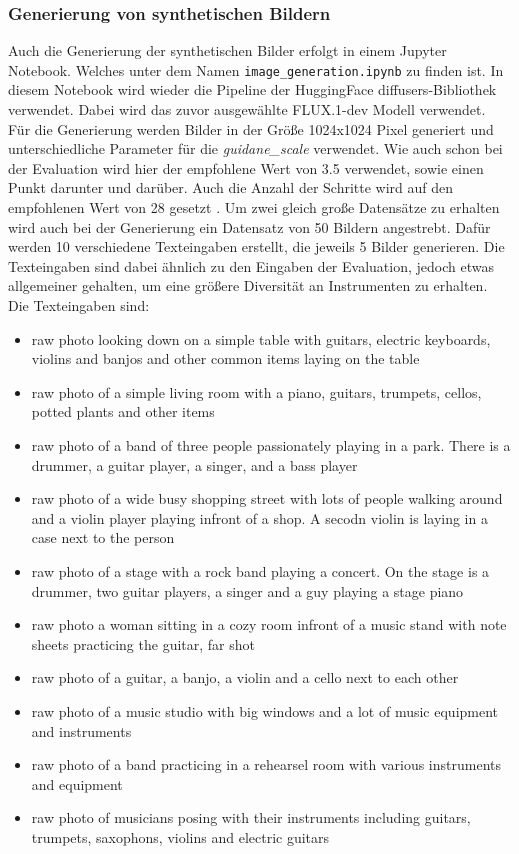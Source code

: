 \subsubsection{Generierung von synthetischen Bildern}
Auch die Generierung der synthetischen Bilder erfolgt in einem Jupyter Notebook. Welches unter dem Namen \texttt{image\_generation.ipynb} zu finden ist. In diesem Notebook wird wieder die Pipeline der HuggingFace diffusers-Bibliothek verwendet. Dabei wird das zuvor ausgewählte FLUX.1-dev Modell verwendet.
Für die Generierung werden Bilder in der Größe 1024x1024 Pixel generiert und unterschiedliche Parameter für die \emph{guidane\_scale} verwendet. Wie auch schon bei der Evaluation wird hier der empfohlene Wert von 3.5 verwendet, sowie einen Punkt darunter und darüber. Auch die Anzahl der Schritte wird auf den empfohlenen Wert von 28 gesetzt \cite{hf-flux}.
Um zwei gleich große Datensätze zu erhalten wird auch bei der Generierung ein Datensatz von 50 Bildern angestrebt. Dafür werden 10 verschiedene Texteingaben erstellt, die jeweils 5 Bilder generieren. Die Texteingaben sind dabei ähnlich zu den Eingaben der Evaluation, jedoch etwas allgemeiner gehalten, um eine größere Diversität an Instrumenten zu erhalten. Die Texteingaben sind:
\begin{itemize}
    \item raw photo looking down on a simple table with guitars, electric keyboards, violins and banjos and other common items laying on the table
    \item raw photo of a simple living room with a piano, guitars, trumpets, cellos, potted plants and other items
    \item raw photo of a band of three people passionately playing in a park. There is a drummer, a guitar player, a singer, and a bass player
    \item raw photo of a wide busy shopping street with lots of people walking around and a violin player playing infront of a shop. A secodn violin is laying in a case next to the person
    \item raw photo of a stage with a rock band playing a concert. On the stage is a drummer, two guitar players, a singer and a guy playing a stage piano
    \item raw photo a woman sitting in a cozy room infront of a music stand with note sheets practicing the guitar, far shot
    \item raw photo of a guitar, a banjo, a violin and a cello next to each other
    \item raw photo of a music studio with big windows and a lot of music equipment and instruments
    \item raw photo of a band practicing in a rehearsel room with various instruments and equipment
    \item raw photo of musicians posing with their instruments including guitars, trumpets, saxophons, violins and electric guitars
\end{itemize}
